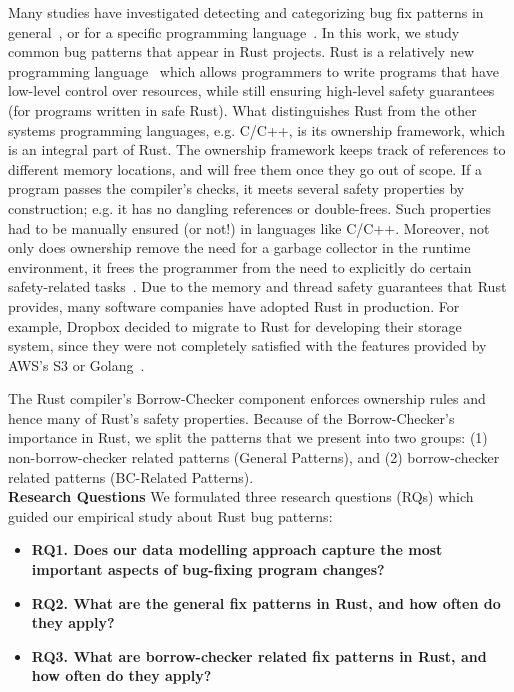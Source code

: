 Many studies have investigated detecting and categorizing bug fix patterns in general~\citep{islam2021changes,madeiral2018towards,pan2009toward}, or for a specific programming language~\citep{yang2022mining,hanam2016discovering,campos2019discovering}. In this work, we study common bug patterns that appear in Rust projects. Rust is a relatively new programming language~\citep{klabnik2019rust} which allows programmers to write programs that have low-level control over resources, while still ensuring high-level safety guarantees (for programs written in safe Rust). What distinguishes Rust from the other systems programming languages, e.g. C/C++, is its ownership framework, which is an integral part of Rust. The ownership framework keeps track of references to different memory locations, and will free them once they go out of scope. If a program passes the compiler’s checks, it meets several safety properties by construction; e.g. it has no dangling references or double-frees. Such properties had to be manually ensured (or not!) in languages like C/C++. Moreover, not only does ownership remove the need for a garbage collector in the runtime environment, it frees the programmer from the need to explicitly do certain safety-related tasks~\citep{qin2020understanding}. Due to the memory and thread safety guarantees that Rust provides, many software companies have adopted Rust in production. For example, Dropbox decided to migrate to Rust for developing their storage system, since they were not completely satisfied with the features provided by AWS’s S3 or Golang~\citep{dropbox}.

The Rust compiler's Borrow-Checker component enforces ownership rules and hence many of Rust's safety properties. Because of the Borrow-Checker's importance in Rust, we split the patterns that we present into two groups: (1) non-borrow-checker related patterns (General Patterns), and (2) borrow-checker related patterns (BC-Related Patterns). \\

\noindent \textbf{Research Questions} We formulated three research questions (RQs) which guided our empirical study about Rust bug patterns:

\begin{itemize}
    \item \textbf{RQ1. Does our data modelling approach capture the most important aspects of bug-fixing program changes?} 
    \item \textbf{RQ2. What are the general fix patterns in Rust, and how often do they apply?} 
    \item \textbf{RQ3. What are borrow-checker related fix patterns in Rust, and how often do they apply?}
\end{itemize}

